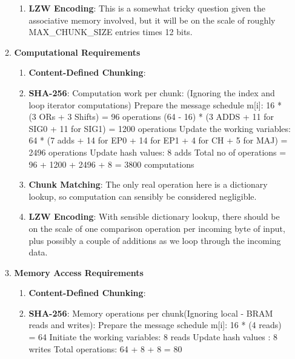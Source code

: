 \documentclass{article}
\begin{document}
\begin{enumerate}
\begin{enumerate}[label=(\alph*)]
\begin{enumerate}[label=(\roman*)]
\item%
\textbf{LZW Encoding}:\newline
This is a somewhat tricky question given the associative memory involved, but it will be on the scale of roughly MAX\_CHUNK\_SIZE entries times 12 bits.

\end{enumerate}%

\item%
\textbf{Computational Requirements}
\begin{enumerate}[label=(\roman*)]
\item%
\textbf{Content-Defined Chunking}:\newline

\item%
\textbf{SHA-256}:\newline
Computation work per chunk: (Ignoring the index and loop iterator computations)
Prepare the message schedule m[i]: 16 * (3 ORs + 3 Shifts) = 96 operations
 						      (64 - 16) * (3 ADDS + 11 for SIG0 + 11 for SIG1) = 1200 operations
Update the working variables: 64 * (7 adds + 14 for EP0 + 14 for EP1 + 4 for CH + 5 for MAJ) = 2496 operations
Update hash values: 8 adds
Total no of operations = 96 + 1200 + 2496 + 8 = 3800 computations

\item%
\textbf{Chunk Matching}:\newline
The only real operation here is a dictionary lookup, so computation can sensibly be considered negligible.

\item%
\textbf{LZW Encoding}:\newline
With sensible dictionary lookup, there should be on the scale of one comparison operation per incoming byte of input, plus possibly a couple of additions as we loop through the incoming data.


\end{enumerate}%

\item%
\textbf{Memory Access Requirements}
\begin{enumerate}[label=(\roman*)]
\item%
\textbf{Content-Defined Chunking}:\newline

\item%
\textbf{SHA-256}:\newline
Memory operations per chunk(Ignoring local - BRAM reads and writes): 
Prepare the message schedule m[i]: 16 * (4 reads) = 64 
Initiate the working variables: 8 reads  
Update hash values : 8 writes
Total operations: 64 + 8 + 8 = 80 


\end{enumerate}
\end{enumerate}
\end{enumerate}
\end{document}
